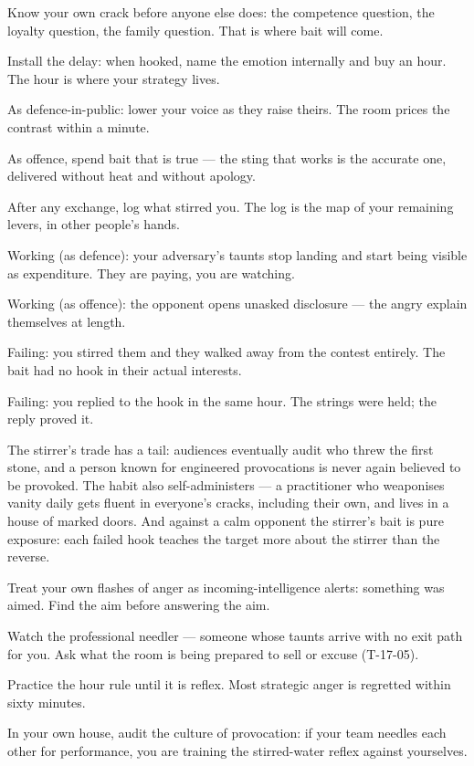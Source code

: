 \begin{application}
  \item Know your own crack before anyone else does: the competence question, the loyalty question, the family question. That is where bait will come.
  \item Install the delay: when hooked, name the emotion internally and buy an hour. The hour is where your strategy lives.
  \item As defence-in-public: lower your voice as they raise theirs. The room prices the contrast within a minute.
  \item As offence, spend bait that is true --- the sting that works is the accurate one, delivered without heat and without apology.
  \item After any exchange, log what stirred you. The log is the map of your remaining levers, in other people's hands.
\end{application}
\begin{feedback}
  \item Working (as defence): your adversary's taunts stop landing and start being visible as expenditure. They are paying, you are watching.
  \item Working (as offence): the opponent opens unasked disclosure --- the angry explain themselves at length.
  \item Failing: you stirred them and they walked away from the contest entirely. The bait had no hook in their actual interests.
  \item Failing: you replied to the hook in the same hour. The strings were held; the reply proved it.
\end{feedback}
\begin{failure}
The stirrer's trade has a tail: audiences eventually audit who threw the first stone, and a person known for engineered provocations is never again believed to be provoked. The habit also self-administers --- a practitioner who weaponises vanity daily gets fluent in everyone's cracks, including their own, and lives in a house of marked doors. And against a calm opponent the stirrer's bait is pure exposure: each failed hook teaches the target more about the stirrer than the reverse.
\end{failure}
\begin{countermeasures}
  \item Treat your own flashes of anger as incoming-intelligence alerts: something was aimed. Find the aim before answering the aim.
  \item Watch the professional needler --- someone whose taunts arrive with no exit path for you. Ask what the room is being prepared to sell or excuse (T-17-05).
  \item Practice the hour rule until it is reflex. Most strategic anger is regretted within sixty minutes.
  \item In your own house, audit the culture of provocation: if your team needles each other for performance, you are training the stirred-water reflex against yourselves.
\end{countermeasures}

\seesources
{}
